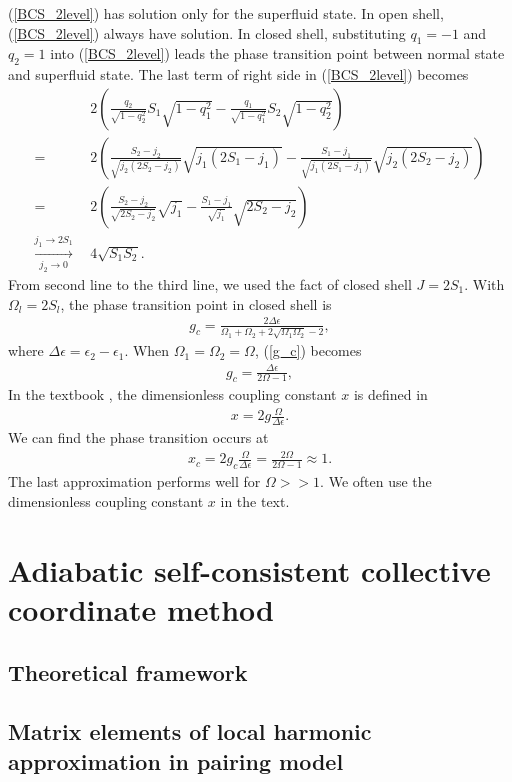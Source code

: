 \documentclass[11pt]{book} %
\begin{document}
(\ref{BCS_2level}) has solution only for the superfluid state. In open shell, (\ref{BCS_2level}) always have solution. In closed shell, substituting $q_1=-1$ and $q_2=1$ into (\ref{BCS_2level}) leads the phase transition point between normal state and superfluid state. The last term of right side in (\ref{BCS_2level}) becomes
\begin{align*}
	& 2\left(\frac{q_2}{\sqrt{1-q_2^2}}S_1\sqrt{1-q_1^2}
	-\frac{q_1}{\sqrt{1-q_1^2}}S_2\sqrt{1-q_2^2}\right) \\
	=\ \ & 2\left(\frac{S_2-j_2}{\sqrt{j_2(2S_2-j_2)}}\sqrt{j_1(2S_1-j_1)}
	- \frac{S_1-j_1}{\sqrt{j_1(2S_1-j_1)}}\sqrt{j_2(2S_2-j_2)}\right) \\
	=\ \ & 2\left(\frac{S_2-j_2}{\sqrt{2S_2-j_2}}\sqrt{j_1}
	- \frac{S_1-j_1}{\sqrt{j_1}}\sqrt{2S_2-j_2}\right) \\ 
	\xrightarrow[j_2\to0]{j_1\to2S_1}\ \ &  4 \sqrt{S_1S_2} .
\end{align*}
From second line to the third line, we used the fact of closed shell $J=2S_1$. With $\Omega_l=2S_l$, the phase transition point in closed shell is
\begin{align}
	g_c = \frac{2\Delta\epsilon}{\Omega_1+\Omega_2+2\sqrt{\Omega_1\Omega_2}-2} ,
	\label{g_c}
\end{align}
where $\Delta\epsilon=\epsilon_2-\epsilon_1$. When $\Omega_1=\Omega_2=\Omega$, (\ref{g_c}) becomes
\begin{align}
	g_c = \frac{\Delta\epsilon}{2\Omega-1} ,
	\label{g_2}
\end{align}
In the textbook \cite{}, the dimensionless coupling constant $x$ is defined in
\begin{align}
	x = 2g \frac{\Omega}{\Delta\epsilon} .
	\label{x}
\end{align}
We can find the phase transition occurs at
\begin{align}
	x_c = 2g_c \frac{\Omega}{\Delta\epsilon} = \frac{2\Omega}{2\Omega-1} \approx 1.
	\label{x_c}
\end{align}
The last approximation performs well for $\Omega>>1$. We often use the dimensionless coupling constant $x$ in the text. 

\clearpage{\pagestyle{empty}\cleardoublepage}
\chapter{Adiabatic self-consistent collective coordinate method}

\section{Theoretical framework}
\section{Matrix elements of local harmonic approximation in pairing model}







\end{document}
